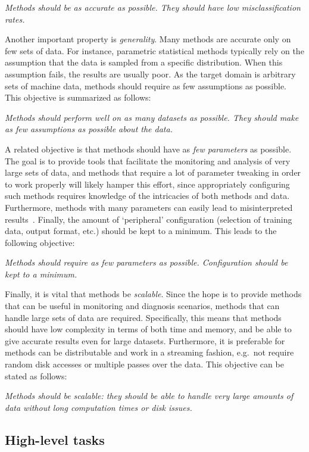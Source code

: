   \emph{Methods should be as accurate as possible. They should have low misclassification rates.}

Another important property is \emph{generality}. Many methods are accurate only on few sets of data. For instance, parametric statistical methods typically rely on the assumption that the data is sampled from a specific distribution. When this assumption fails, the results are usually poor. As the target domain is arbitrary sets of machine data, methods should require as few assumptions as possible. This objective is summarized as follows:

  \emph{Methods should perform well on as many datasets as possible. They should make as few assumptions as possible about the data.}

A related objective is that methods should have as \emph{few parameters} as possible. The goal is to provide tools that facilitate the monitoring and analysis of very large sets of data, and methods that require a lot of parameter tweaking in order to work properly will likely hamper this effort, since appropriately configuring such methods requires knowledge of the intricacies of both methods and data. Furthermore, methods with many parameters can easily lead to misinterpreted results~\cite{keogh2}. Finally, the amount of `peripheral' configuration (selection of training data, output format, etc.) should be kept to a minimum. This leads to the following objective:

  \emph{Methods should require as few parameters as possible. Configuration should be kept to a minimum.}

Finally, it is vital that methods be \emph{scalable}. Since the hope is to provide methods that can be useful in monitoring and diagnosis scenarios, methods that can handle large sets of data are required. Specifically, this means that methods should have low complexity in terms of both time and memory, and be able to give accurate results even for large datasets. Furthermore, it is preferable for methods can be distributable and work in a streaming fashion, e.g.\ not require random disk accesses or multiple passes over the data. This objective can be stated as follows:

  \emph{Methods should be scalable: they should be able to handle very large amounts of data without long computation times or disk issues.}

\subsection{High-level tasks}
\label{sect:relevant_tasks}

